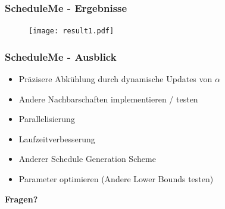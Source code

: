 \documentclass[aspectratio=169]{beamer}
\begin{document}

\begin{frame}[t]
	\frametitle{ScheduleMe - Ergebnisse}
	\vspace{-12pt}
	\begin{figure}
		\centering
		\texttt{[image: result1.pdf]}
	\end{figure}	
\end{frame}


\begin{frame}[t]
\frametitle{ScheduleMe - Ausblick}

\begin{itemize}
	\item Präzisere Abkühlung durch dynamische Updates von $\alpha$
	\item Andere Nachbarschaften implementieren / testen
	\item Parallelisierung
	\item Laufzeitverbesserung
	\item Anderer Schedule Generation Scheme
	\item Parameter optimieren (Andere Lower Bounds testen)
	\pause
\end{itemize}
\centering
\vspace{40pt}
\textbf{\Large{Fragen?}}
\end{frame}
\end{document}
